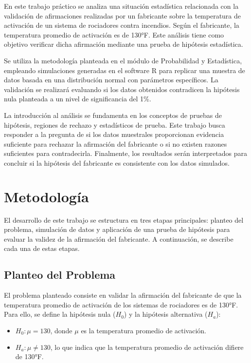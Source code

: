 \documentclass[a4paper,12pt]{article}
\begin{document}
En este trabajo práctico se analiza una situación estadística relacionada con la validación de afirmaciones realizadas por un fabricante sobre la temperatura de activación de un sistema de rociadores contra incendios. Según el fabricante, la temperatura promedio de activación es de 130°F. Este análisis tiene como objetivo verificar dicha afirmación mediante una prueba de hipótesis estadística.

Se utiliza la metodología planteada en el módulo de Probabilidad y Estadística, empleando simulaciones generadas en el software R para replicar una muestra de datos basada en una distribución normal con parámetros específicos. La validación se realizará evaluando si los datos obtenidos contradicen la hipótesis nula planteada a un nivel de significancia del 1\%.

La introducción al análisis se fundamenta en los conceptos de pruebas de hipótesis, regiones de rechazo y estadísticos de prueba. Este trabajo busca responder a la pregunta de si los datos muestrales proporcionan evidencia suficiente para rechazar la afirmación del fabricante o si no existen razones suficientes para contradecirla. Finalmente, los resultados serán interpretados para concluir si la hipótesis del fabricante es consistente con los datos simulados.


\section{Metodología}

El desarrollo de este trabajo se estructura en tres etapas principales: planteo del problema, simulación de datos y aplicación de una prueba de hipótesis para evaluar la validez de la afirmación del fabricante. A continuación, se describe cada una de estas etapas.

\subsection{Planteo del Problema}
El problema planteado consiste en validar la afirmación del fabricante de que la temperatura promedio de activación de los sistemas de rociadores es de 130°F. Para ello, se define la hipótesis nula (\(H_0\)) y la hipótesis alternativa (\(H_a\)):

\begin{itemize}
    \item \(H_0: \mu = 130\), donde \(\mu\) es la temperatura promedio de activación.
    \item \(H_a: \mu \neq 130\), lo que indica que la temperatura promedio de activación difiere de 130°F.
\end{itemize}
\end{document}
